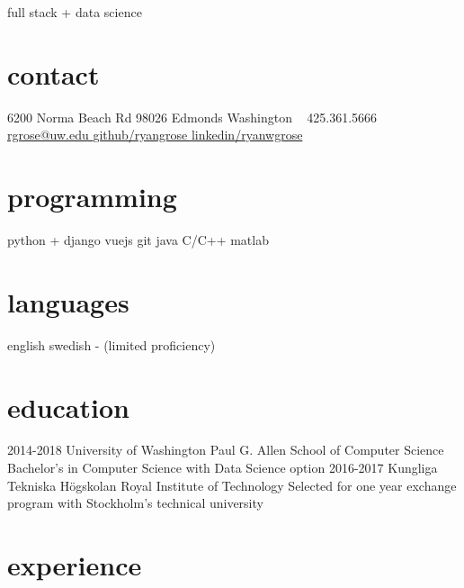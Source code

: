 \documentclass[]{friggeri-cv}
\begin{document}
       {full stack + data science}


\begin{aside}
  \section{contact}
    6200 Norma Beach Rd
    98026 Edmonds
    Washington
    ~
    425.361.5666
    \href{mailto:rgrose@uw.edu}{rgrose@uw.edu \faEnvelope}
    \href{https://www.github.com/ryangrose}{github/ryangrose \faGithub}
    \href{https://www.linkedin.com/in/ryanwgrose}{linkedin/ryanwgrose \faLinkedin}
  \section{programming}
    python + django
    vuejs
    git
    java
    C/C++
    matlab
  \section{languages}
    english
    swedish -
    (limited proficiency)
\end{aside}



\section{education}

\begin{entrylist}
  \entry
    {2014-2018}
    {University of Washington}
    {Paul G. Allen School of Computer Science}
    {Bachelor's in Computer Science with Data Science option}
  \entry
    {2016-2017}
    {Kungliga Tekniska Högskolan}
    {Royal Institute of Technology }
    {Selected for one year exchange program with Stockholm's technical university}
\end{entrylist}

\section{experience}
\end{document}
